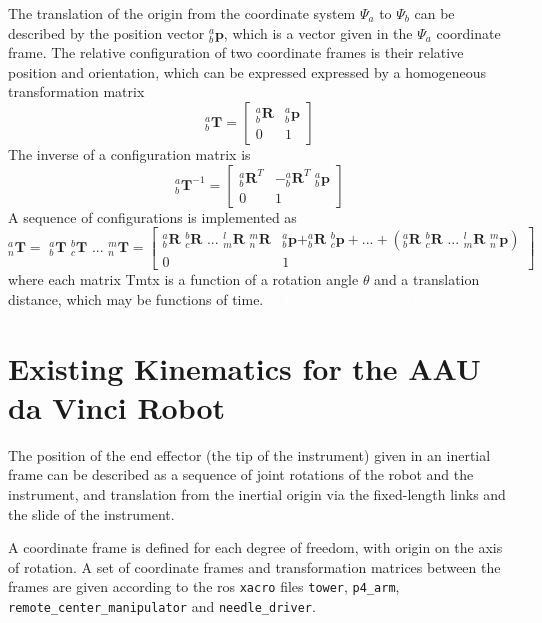 The translation of the origin from the coordinate system $\Psi_a$ to $\Psi_b$ can be described by the position vector $^a_b\mathbf{p}$, which is a vector given in the $\Psi_a$ coordinate frame.
The relative configuration of two coordinate frames is their relative position and orientation, which can be expressed expressed by a homogeneous transformation matrix
\begin{equation}
^a_b\mathbf{T} = 
\begin{bmatrix}
^a_b\mathbf{R} & ^a_b\mathbf{p}\\
0 & 1
\end{bmatrix}
\end{equation}
The inverse of a configuration matrix is
\begin{equation}
^a_b\mathbf{T}^{-1} = 
\begin{bmatrix}
^a_b\mathbf{R}^T & -^a_b\mathbf{R}^T\,\,^a_b\mathbf{p}\\
0 & 1
\end{bmatrix}
\end{equation}
A sequence of configurations is implemented as
\begin{equation}
^a_n\mathbf{T} =\,\, ^a_b\mathbf{T} \,\, ^b_c\mathbf{T} \,\,...\,\, ^m_n\mathbf{T} = 
\begin{bmatrix}
^a_b\mathbf{R} \,\, ^b_c\mathbf{R} \,\,...\,\, ^l_m\mathbf{R} \,\,^m_n\mathbf{R} & ^a_b\mathbf{p} + ^a_b\mathbf{R} \,\, ^b_c\mathbf{p} + ... + (^a_b\mathbf{R}\,\, ^b_c\mathbf{R} \,\,...\,\, ^l_m\mathbf{R} \,\, ^m_n\mathbf{p} )\\
0 & 1
\end{bmatrix}
\end{equation}
where each matrix \gls{Tmtx} is a function of a rotation angle $\theta$ and a translation distance, which may be functions of time. \textcolor{white}{\gls{Rot} \gls{p_vec} \gls{alpha} \gls{beta} \gls{theta}}


\section{Existing Kinematics for the AAU da Vinci Robot}\label{sec:existing_kinematics}
The position of the end effector (the tip of the instrument) given in an inertial frame can be described as a sequence of joint rotations of the robot and the instrument, and translation from the inertial origin via the fixed-length links and the slide of the instrument.

A coordinate frame is defined for each degree of freedom, with origin on the axis of rotation. A set of coordinate frames and transformation matrices between the frames are given according to the \gls{ros} \texttt{xacro} files \texttt{tower}, \texttt{p4\_arm}, \texttt{remote\_center\_manipulator} and \texttt{needle\_driver}.

